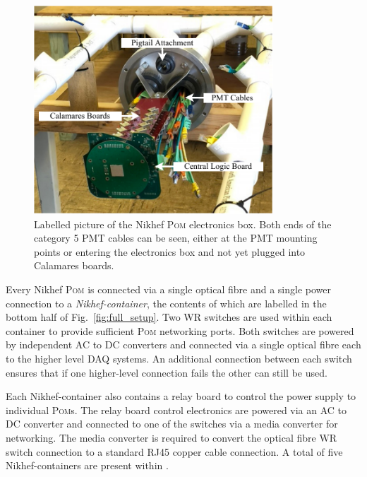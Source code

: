 \begin{figure} %
    \includegraphics[width=0.8\textwidth]{diagrams/5-daq/nikhef_plane.pdf}
    \caption[Labelled picture of the Nikhef \textsc{Pom} electronics box]
    {Labelled picture of the Nikhef \textsc{Pom} electronics box. Both ends of the category 5 PMT
        cables can be seen, either at the PMT mounting points or entering the electronics box and
        not yet plugged into Calamares boards.}
    \label{fig:nikhef_plane}
\end{figure}

Every Nikhef \textsc{Pom} is connected via a single optical fibre and a single power connection to
a \emph{Nikhef-container}, the contents of which are labelled in the bottom half of
Fig.~\ref{fig:full_setup}. Two WR switches are used within each container to provide sufficient
\textsc{Pom} networking ports. Both switches are powered by independent AC to DC converters and
connected via a single optical fibre each to the higher level DAQ systems. An additional
connection between each switch ensures that if one higher-level connection fails the other can
still be used.

Each Nikhef-container also contains a relay board to control the power supply to individual
\textsc{Pom}s. The relay board control electronics are powered via an AC to DC converter and
connected to one of the switches via a media converter for networking. The media converter is
required to convert the optical fibre WR switch connection to a standard RJ45 copper cable
connection. A total of five Nikhef-containers are present within \chipsfive.

